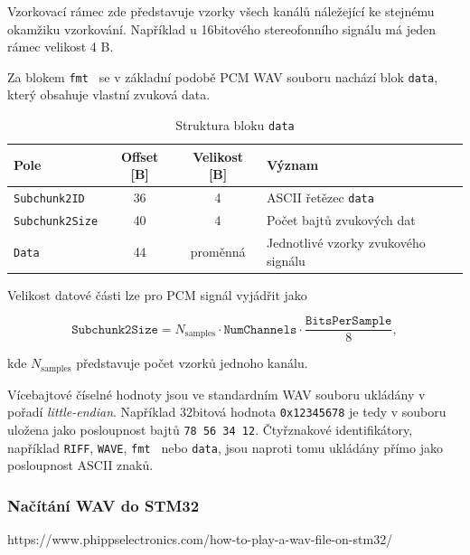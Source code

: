 Vzorkovací rámec zde představuje vzorky všech kanálů náležející ke
stejnému okamžiku vzorkování. Například u 16bitového stereofonního
signálu má jeden rámec velikost 4 B.

Za blokem \texttt{fmt } se v základní podobě PCM WAV souboru nachází
blok \texttt{data}, který obsahuje vlastní zvuková data.

\begin{table}[ht]
    \centering
    \caption{Struktura bloku \texttt{data}}
    \label{tab:wav_data}
    \begin{tabular}{lccp{7cm}}
        \toprule
        \textbf{Pole} & \textbf{Offset [B]} & \textbf{Velikost [B]} & \textbf{Význam} \\
        \midrule
        \texttt{Subchunk2ID}
        & 36 & 4
        & ASCII řetězec \texttt{data} \\

        \texttt{Subchunk2Size}
        & 40 & 4
        & Počet bajtů zvukových dat \\

        \texttt{Data}
        & 44 & proměnná
        & Jednotlivé vzorky zvukového signálu \\
        \bottomrule
    \end{tabular}
\end{table}

Velikost datové části lze pro PCM signál vyjádřit jako

\begin{equation}
    \texttt{Subchunk2Size}
    =
    N_\mathrm{samples}
    \cdot
    \texttt{NumChannels}
    \cdot
    \frac{\texttt{BitsPerSample}}{8},
\end{equation}

kde $N_\mathrm{samples}$ představuje počet vzorků jednoho kanálu.

Vícebajtové číselné hodnoty jsou ve standardním WAV souboru ukládány v pořadí \textit{little-endian}. Například 32bitová hodnota \texttt{0x12345678} je tedy v souboru uložena jako posloupnost bajtů \texttt{78 56 34 12}. Čtyřznakové identifikátory, například \texttt{RIFF}, \texttt{WAVE}, \texttt{fmt } nebo \texttt{data}, jsou naproti tomu ukládány přímo jako posloupnost ASCII znaků\cite{wav_internet_archive}.

\subsubsection{Načítání WAV do STM32}
https://www.phippselectronics.com/how-to-play-a-wav-file-on-stm32/









